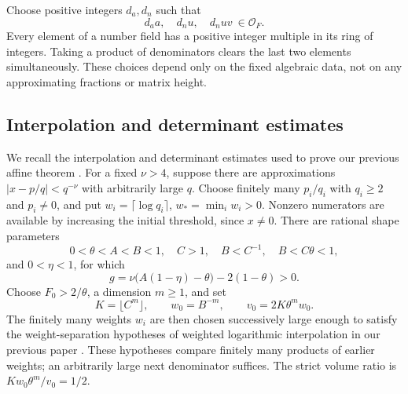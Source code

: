 \documentclass[11pt]{article}
\newcommand{\OO}{\mathcal O}
\theoremstyle{remark}
\begin{document}
Choose positive integers $d_a,d_n$ such that
\begin{equation}\label{eq:fixedclearing}
 d_a a,\quad d_n u,\quad d_n uv\ \in\OO_F.
\end{equation}
Every element of a number field has a positive integer multiple in its
ring of integers. Taking a product of denominators clears the last two
elements simultaneously. These choices depend only on the fixed
algebraic data, not on any approximating fractions or matrix height.

\subsection{Interpolation and determinant estimates}
We recall the interpolation and determinant estimates used to prove
our previous affine theorem \cite{affine}.
For a fixed $\nu>4$, suppose there are approximations
$|x-p/q|<q^{-\nu}$ with arbitrarily large $q$. Choose finitely many
$p_i/q_i$ with $q_i\ge2$ and $p_i\ne0$, and put
$w_i=\lceil\log q_i\rceil$, $w_* = \min_i w_i>0$.
Nonzero numerators are available by increasing the initial threshold,
since $x\ne0$.
There are rational shape parameters
\begin{equation}\label{eq:shape}
0<\theta<A<B<1,\quad C>1,\quad B<C^{-1},\quad B<C\theta<1,
\end{equation}
and $0<\eta<1$, for which
\begin{equation}\label{eq:gap}
g=\nu\bigl(A(1-\eta)-\theta\bigr)-2(1-\theta)>0.
\end{equation}
Choose $F_0>2/\theta$, a dimension $m\ge1$, and set
\begin{equation}\label{eq:dimension}
K=\lfloor C^m\rfloor,\qquad w_0=B^{-m},\qquad
v_0=2K\theta^m w_0.
\end{equation}
The finitely many weights $w_i$ are then chosen successively large
enough to satisfy the weight-separation hypotheses of weighted
logarithmic interpolation in our previous paper
\cite[Sections 4--5]{affine}. These
hypotheses compare finitely many products of earlier weights; an
arbitrarily large next denominator suffices. The strict volume ratio is
$Kw_0\theta^m/v_0=1/2$.
\end{document}
